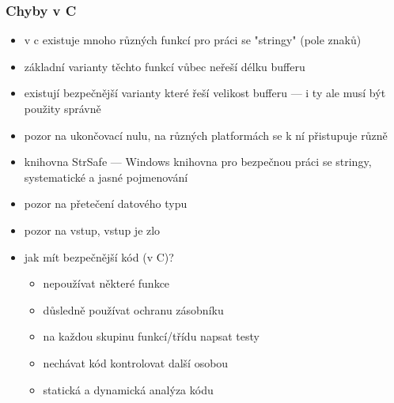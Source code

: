 \subsubsection*{Chyby v C}
\begin{itemize}
    \item v c existuje mnoho různých funkcí pro práci se "stringy" (pole znaků)
    \item základní varianty těchto funkcí vůbec neřeší délku bufferu
    \item existují bezpečnější varianty které řeší velikost bufferu --- i ty ale musí být použity správně
    \item pozor na ukončovací nulu, na různých platformách se k ní přistupuje různě
    \item knihovna StrSafe --- Windows knihovna pro bezpečnou práci se stringy, systematické a jasné pojmenování
    \item pozor na přetečení datového typu
    \item pozor na vstup, vstup je zlo
    \item jak mít bezpečnější kód (v C)?
    \begin{itemize}
        \item nepoužívat některé funkce
        \item důsledně používat ochranu zásobníku
        \item na každou skupinu funkcí/třídu napsat testy
        \item nechávat kód kontrolovat další osobou
        \item statická a dynamická analýza kódu
        
    \end{itemize}
\end{itemize}